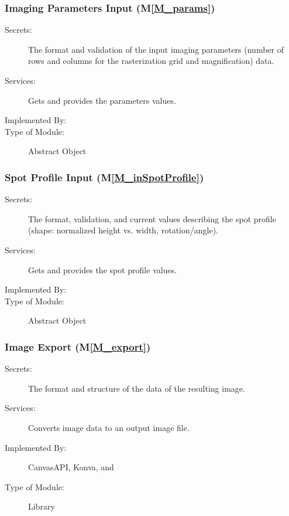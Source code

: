 \documentclass[12pt, titlepage]{article}
\newcommand{\mref}[1]{M\ref{#1}}
\begin{document}
\subsubsection{Imaging Parameters Input (\mref{M_params})}
\begin{description}
\item[Secrets:] The format and validation of the input imaging parameters (number
  of rows and columns for the rasterization grid and magnification) data.
\item[Services:] Gets and provides the parameters values.
\item[Implemented By:] \progname{}
\item[Type of Module:] Abstract Object
\end{description}


\subsubsection{Spot Profile Input (\mref{M_inSpotProfile})}
\begin{description}
\item[Secrets:] The format, validation, and current values describing the spot profile
  (shape: normalized height vs. width, rotation/angle).
\item[Services:] Gets and provides the spot profile values.
\item[Implemented By:] \progname{}
\item[Type of Module:] Abstract Object
\end{description}


\subsubsection{Image Export (\mref{M_export})}
\begin{description}
\item[Secrets:] The format and structure of the data of the resulting image.
\item[Services:] Converts image data to an output image file.
\item[Implemented By:] CanvasAPI, Konva, and \progname{}
\item[Type of Module:] Library
\end{description}
\end{document}
